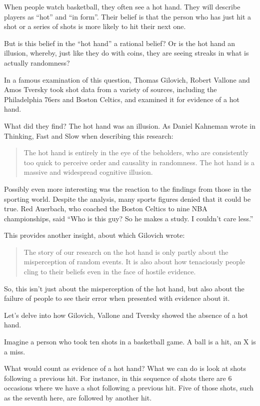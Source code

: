 \documentclass[
]{book}
\begin{document}
When people watch basketball, they often see a hot hand. They will describe players as ``hot'' and ``in form''. Their belief is that the person who has just hit a shot or a series of shots is more likely to hit their next one.

But is this belief in the ``hot hand'' a rational belief? Or is the hot hand an illusion, whereby, just like they do with coins, they are seeing streaks in what is actually randomness?

In a famous examination of this question, Thomas Gilovich, Robert Vallone and Amos Tversky took shot data from a variety of sources, including the Philadelphia 76ers and Boston Celtics, and examined it for evidence of a hot hand.

What did they find? The hot hand was an illusion. As Daniel Kahneman wrote in Thinking, Fast and Slow when describing this research:

\begin{quote}
The hot hand is entirely in the eye of the beholders, who are consistently too quick to perceive order and causality in randomness. The hot hand is a massive and widespread cognitive illusion.
\end{quote}

Possibly even more interesting was the reaction to the findings from those in the sporting world. Despite the analysis, many sports figures denied that it could be true. Red Auerbach, who coached the Boston Celtics to nine NBA championships, said ``Who is this guy? So he makes a study. I couldn't care less.''

This provides another insight, about which Gilovich wrote:

\begin{quote}
The story of our research on the hot hand is only partly about the misperception of random events. It is also about how tenaciously people cling to their beliefs even in the face of hostile evidence.
\end{quote}

So, this isn't just about the misperception of the hot hand, but also about the failure of people to see their error when presented with evidence about it.

Let's delve into how Gilovich, Vallone and Tversky showed the absence of a hot hand.

Imagine a person who took ten shots in a basketball game. A ball is a hit, an X is a miss.

What would count as evidence of a hot hand? What we can do is look at shots following a previous hit. For instance, in this sequence of shots there are 6 occasions where we have a shot following a previous hit. Five of those shots, such as the seventh here, are followed by another hit.
\end{document}

